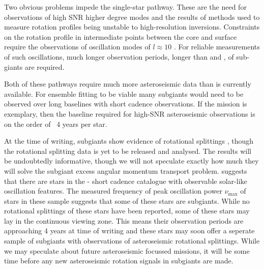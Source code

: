 Two obvious problems impede the single-star pathway. 
These are the need for observations of high SNR higher degree modes and the results of methods used to measure rotation profiles being unstable to high-resolution inversions. 
Constraints on the rotation profile in intermediate points between the core and surface require the observations of oscillation modes of $l \approx 10$ \citep{ahlborn_asteroseismic_2020}. 
For reliable measurements of such oscillations, much longer observation periods, longer than \corot{} and \kepler{}, of sub-giants are required.
   
Both of these pathways require much more asteroseismic data than is currently available.
For ensemble fitting to be viable many subgiants would need to be observed over long baselines with short cadence observations.
If the \kepler{} mission is exemplary, then the baseline required for high-SNR asteroseismic observations is on the order of ~4 years per star.

At the time of writing,  subgiants show evidence of rotational splittings \citep{li_asteroseismology_2020,li_asteroseismology_2020-1}, though the rotational splitting data is yet to be released and analysed.
The results will be undoubtedly informative, though we will not speculate exactly how much they will solve the subgiant excess angular momentum transport problem.
\citet{hatt_catalogue_2023} suggests that there are  stars in the \tess{} - short cadence catalogue with observable solar-like oscillation features.
The measured frequency of peak oscillation power $\nu_{\text{max}}$ of stars in these sample suggests that some of these stars are subgiants.
While no rotational splittings of these stars have been reported, some of these stars may lay in the continuous viewing zone.
This means their observation periods are approaching 4 years at time of writing and these stars may soon offer a seperate sample of subgiants with observations of asteroseismic rotational splittings.
While we may speculate about future asteroseismic focussed missions, it will be some time before any new asteroseismic rotation signals in subgiants are made.

